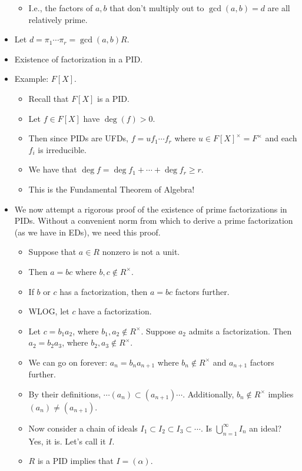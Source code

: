 \documentclass[../notes.tex]{subfiles}
\begin{document}
\begin{itemize}
    \begin{itemize}
        \item I.e., the factors of $a,b$ that don't multiply out to $\gcd(a,b)=d$ are all relatively prime.
    \end{itemize}
    \item Let $d=\pi_1\cdots\pi_r=\gcd(a,b)R$.
    \item Existence of factorization in a PID.
    \item Example: $F[X]$.
    \begin{itemize}
        \item Recall that $F[X]$ is a PID.
        \item Let $f\in F[X]$ have $\deg(f)>0$.
        \item Then since PIDs are UFDs, $f=uf_1\cdots f_r$ where $u\in F[X]^\times=F^\times$ and each $f_i$ is irreducible.
        \item We have that $\deg f=\deg f_1+\cdots+\deg f_r\geq r$.
        \item This is the Fundamental Theorem of Algebra!
    \end{itemize}
    \item We now attempt a rigorous proof of the existence of prime factorizations in PIDs. Without a convenient norm from which to derive a prime factorization (as we have in EDs), we need this proof.
    \begin{itemize}
        \item Suppose that $a\in R$ nonzero is not a unit.
        \item Then $a=bc$ where $b,c\notin R^\times$.
        \item If $b$ or $c$ has a factorization, then $a=bc$ factors further.
        \item WLOG, let $c$ have a factorization.
        \item Let $c=b_1a_2$, where $b_1,a_2\notin R^\times$. Suppose $a_2$ admits a factorization. Then $a_2=b_2a_3$, where $b_2,a_3\notin R^\times$.
        \item We can go on forever: $a_n=b_na_{n+1}$ where $b_n\notin R^\times$ and $a_{n+1}$ factors further.
        \item By their definitions, $\cdots(a_n)\subset(a_{n+1})\cdots$. Additionally, $b_n\notin R^\times$ implies $(a_n)\neq(a_{n+1})$.
        \item Now consider a chain of ideals $I_1\subset I_2\subset I_3\subset\cdots$. Is $\bigcup_{n=1}^\infty I_n$ an ideal? Yes, it is. Let's call it $I$.
        \item $R$ is a PID implies that $I=(\alpha)$.

\end{itemize}
\end{itemize}
\end{document}
